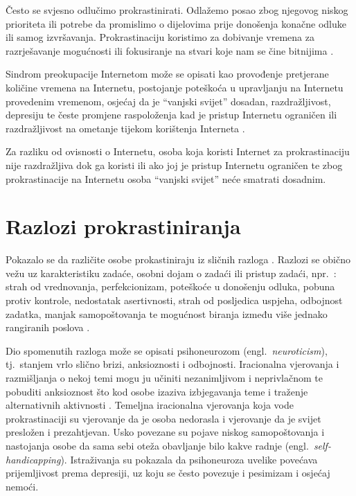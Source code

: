 \documentclass[11pt,twocolumn,english]{article}
\newcommand{\engl}[1]{(engl.~\emph{#1})}
\begin{document}
Često se svjesno odlučimo prokrastinirati. Odlažemo posao zbog njegovog niskog
prioriteta ili potrebe da promislimo o dijelovima prije donošenja konačne odluke
ili samog izvršavanja. Prokrastinaciju koristimo za dobivanje vremena za
razrješavanje mogućnosti ili fokusiranje na stvari koje nam se čine bitnijima
\cite{burka2004procrastination}.

Sindrom preokupacije Internetom može se opisati kao provođenje pretjerane
količine vremena na Internetu, postojanje poteškoća u upravljanju na Internetu provedenim
vremenom, osjećaj da je ``vanjski svijet'' dosadan, razdražljivost, depresiju
te česte promjene raspoloženja kad je pristup Internetu ograničen ili
razdražljivost na ometanje tijekom korištenja Interneta
\cite{yellowlees2007problematic}.
 
Za razliku od ovisnosti o Internetu, osoba koja koristi Internet za
prokrastinaciju nije razdražljiva dok ga koristi ili ako joj je pristup
Internetu ograničen te zbog prokrastinacije na Internetu osoba ``vanjski
svijet'' neće smatrati dosadnim.


\section{Razlozi prokrastiniranja}
Pokazalo se da različite osobe prokastiniraju iz sličnih razloga
\cite{steel2007nature}. Razlozi se obično vežu uz karakteristiku zadaće, osobni
dojam o zadaći ili pristup zadaći, npr.~\cite{solomon1984academic}: strah od
vrednovanja, perfekcionizam, poteškoće u donošenju odluka, pobuna protiv
kontrole, nedostatak asertivnosti, strah od posljedica uspjeha, odbojnost
zadatka, manjak samopoštovanja te mogućnost biranja između više jednako
rangiranih poslova \cite{o2001choice}.

Dio spomenutih razloga može se opisati psihoneurozom \engl{neuroticism},
tj.~stanjem vrlo slično brizi, anksioznosti i odbojnosti. Iracionalna vjerovanja
i razmišljanja o nekoj temi mogu ju učiniti nezanimljivom i neprivlačnom te
pobuditi anksioznost što kod osobe izaziva izbjegavanja teme i traženje
alternativnih aktivnosti \cite{steel2007nature}. Temeljna iracionalna
vjerovanja koja vode prokrastinaciji su vjerovanje da je osoba nedorasla i vjerovanje da je svijet
presložen i prezahtjevan. Usko povezane su pojave niskog samopoštovanja i
nastojanja osobe da sama sebi oteža obavljanje bilo kakve radnje
\engl{self-handicapping}. Istraživanja \cite{Caballero95neuro, Saklofske95neuro}
su pokazala da psihoneuroza uvelike povećava prijemljivost prema depresiji, uz
koju se često povezuje i pesimizam i osjećaj nemoći.
\end{document}
